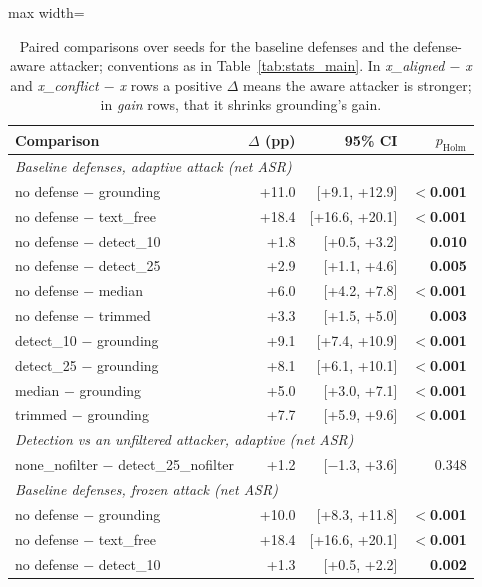 \begin{table}[t]
\centering
\caption{Paired comparisons over seeds for the baseline defenses and the defense-aware attacker; conventions as in Table~\ref{tab:stats_main}. In \emph{x\_aligned $-$ x} and \emph{x\_conflict $-$ x} rows a positive $\Delta$ means the aware attacker is stronger; in \emph{gain} rows, that it shrinks grounding's gain.}
\label{tab:stats_extensions}
\footnotesize
\begin{adjustbox}{max width=\linewidth}
\begin{tabular}{lrrr}
\toprule
Comparison & $\Delta$ (pp) & 95\% CI & $p_{\mathrm{Holm}}$ \\
\midrule
\multicolumn{4}{l}{\textit{Baseline defenses, adaptive attack (net ASR)}} \\
no defense $-$ grounding & +11.0 & [+9.1, +12.9] & \textbf{$<$0.001} \\
no defense $-$ text\_free & +18.4 & [+16.6, +20.1] & \textbf{$<$0.001} \\
no defense $-$ detect\_10 & +1.8 & [+0.5, +3.2] & \textbf{0.010} \\
no defense $-$ detect\_25 & +2.9 & [+1.1, +4.6] & \textbf{0.005} \\
no defense $-$ median & +6.0 & [+4.2, +7.8] & \textbf{$<$0.001} \\
no defense $-$ trimmed & +3.3 & [+1.5, +5.0] & \textbf{0.003} \\
detect\_10 $-$ grounding & +9.1 & [+7.4, +10.9] & \textbf{$<$0.001} \\
detect\_25 $-$ grounding & +8.1 & [+6.1, +10.1] & \textbf{$<$0.001} \\
median $-$ grounding & +5.0 & [+3.0, +7.1] & \textbf{$<$0.001} \\
trimmed $-$ grounding & +7.7 & [+5.9, +9.6] & \textbf{$<$0.001} \\
\midrule
\multicolumn{4}{l}{\textit{Detection vs an unfiltered attacker, adaptive (net ASR)}} \\
none\_nofilter $-$ detect\_25\_nofilter & +1.2 & [$-$1.3, +3.6] & 0.348 \\
\midrule
\multicolumn{4}{l}{\textit{Baseline defenses, frozen attack (net ASR)}} \\
no defense $-$ grounding & +10.0 & [+8.3, +11.8] & \textbf{$<$0.001} \\
no defense $-$ text\_free & +18.4 & [+16.6, +20.1] & \textbf{$<$0.001} \\
no defense $-$ detect\_10 & +1.3 & [+0.5, +2.2] & \textbf{0.002} \\

\end{tabular}
\end{adjustbox}
\end{table}
